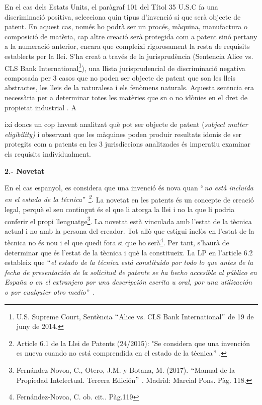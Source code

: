 \documentclass[12pt]{article}
\renewcommand{\_}{\kern-1.5pt\textunderscore\kern-1.5pt}
\begin{document}
\begin{itemize}
\vspace{\baselineskip}
\begin{justify}
{\fontsize{11pt}{13.2pt}\selectfont En el cas dels Estats Units, el paràgraf 101 del Títol 35 U.S.C fa una discriminació positiva, selecciona quin tipus d’invenció sí que serà objecte de patent. En aquest cas, només ho podrà ser un procés, màquina, manufactura o composició de matèria, cap altre creació serà protegida com a patent sinó pertany a la numeració anterior, encara que compleixi rigorosament la resta de requisits establerts per la llei. S’ha creat a través de la jurisprudència (Sentencia Alice vs. CLS Bank International\footnote{ U.S. Supreme Court, Sentència $``$Alice vs. CLS Bank International$"$  de 19 de juny de 2014.  }), una llista jurisprudencial de discriminació negativa composada per 3 casos que no poden ser objecte de patent que son les lleis abstractes, les lleis de la naturalesa i els fenòmens naturals. Aquesta sentncia era necessària per a determinar totes les matèries que sn o no idònies en el dret de propietat industrial . A\par}ixí doncs un cop havent analitzat què pot ser objecte de patent (\textit{subject matter eligibility)} i observant que les màquines poden produir resultats idonis de ser protegits com a patents en les 3 jurisdiccions analitzades és imperatiu examinar els requisits individualment. 
\end{justify}\par


\vspace{\baselineskip}
\textbf{2.- Novetat}\par


\vspace{\baselineskip}
\begin{justify}
En el cas espanyol, es considera que una invenció és nova quan \textit{$``$no està incluida en el estado de la técnica$"$ \footnote{ Article 6.1 de la Llei de Patents (24/2015): "Se considera que una invención es nueva cuando no está comprendida en el estado de la técnica$"$ .  }. }La novetat en les patents és un concepte de creació legal, perquè el seu contingut és el que li atorga la llei i no la que li podria conferir el propi llenguatge\footnote{ Fernández-Novoa, C., Otero, J.M. y Botana, M. (2017). $``$Manual de la Propiedad Intelectual. Tercera Edición$"$ . Madrid: Marcial Pons. Pàg. 118.  }. La novetat està vinculada amb l’estat de la tècnica actual i no amb la persona del creador. Tot allò que estigui inclòs en l’estat de la tècnica no és nou i el que quedi fora si que ho serà\footnote{ Fernández-Novoa, C. ob. cit.. Pàg.119 }. Per tant, s’haurà de determinar que és l’estat de la tècnica i què la constitueix.  La LP en l’article 6.2 estableix que $``$\textit{el estado de la técnica está constituido por todo lo que antes de la fecha de presentación de la solicitud de patente se ha hecho accesible al público en España o en el extranjero por una descripción escrita u oral, por una utilización o por cualquier otro medio$"$ . }
\end{justify}\par


\end{itemize}
\end{document}
